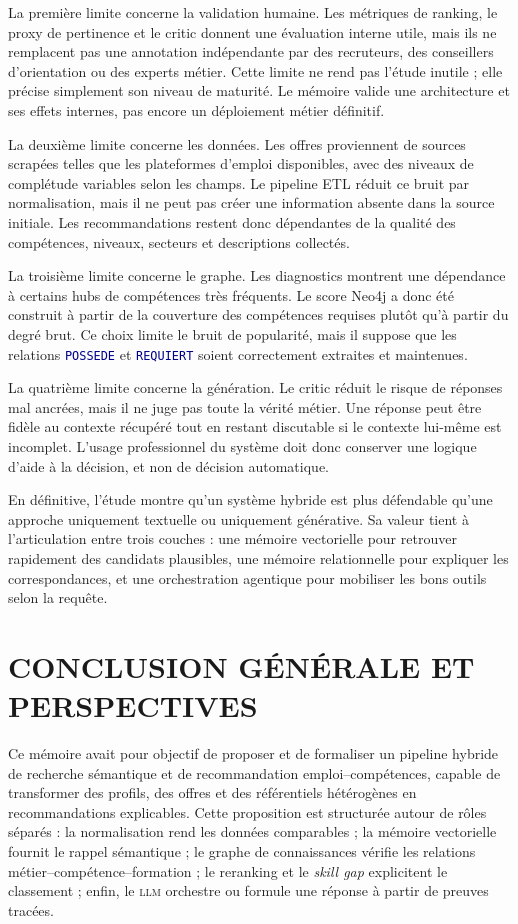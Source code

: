 \documentclass[12pt,twoside]{report}
\newcommand{\filevar}[1]{\texttt{\textcolor{darkblue}{#1}}}
\newcommand{\LLM}{\textsc{llm}}
\begin{document}
La première limite concerne la validation humaine. Les métriques de ranking, le proxy de pertinence et le critic donnent une évaluation interne utile, mais ils ne remplacent pas une annotation indépendante par des recruteurs, des conseillers d'orientation ou des experts métier. Cette limite ne rend pas l'étude inutile ; elle précise simplement son niveau de maturité. Le mémoire valide une architecture et ses effets internes, pas encore un déploiement métier définitif.

La deuxième limite concerne les données. Les offres proviennent de sources scrapées telles que les plateformes d'emploi disponibles, avec des niveaux de complétude variables selon les champs. Le pipeline ETL réduit ce bruit par normalisation, mais il ne peut pas créer une information absente dans la source initiale. Les recommandations restent donc dépendantes de la qualité des compétences, niveaux, secteurs et descriptions collectés.

La troisième limite concerne le graphe. Les diagnostics montrent une dépendance à certains hubs de compétences très fréquents. Le score Neo4j a donc été construit à partir de la couverture des compétences requises plutôt qu'à partir du degré brut. Ce choix limite le bruit de popularité, mais il suppose que les relations \filevar{POSSEDE} et \filevar{REQUIERT} soient correctement extraites et maintenues.

La quatrième limite concerne la génération. Le critic réduit le risque de réponses mal ancrées, mais il ne juge pas toute la vérité métier. Une réponse peut être fidèle au contexte récupéré tout en restant discutable si le contexte lui-même est incomplet. L'usage professionnel du système doit donc conserver une logique d'aide à la décision, et non de décision automatique.

En définitive, l'étude montre qu'un système hybride est plus défendable qu'une approche uniquement textuelle ou uniquement générative. Sa valeur tient à l'articulation entre trois couches : une mémoire vectorielle pour retrouver rapidement des candidats plausibles, une mémoire relationnelle pour expliquer les correspondances, et une orchestration agentique pour mobiliser les bons outils selon la requête.


\chapter*{CONCLUSION GÉNÉRALE ET PERSPECTIVES}
Ce mémoire avait pour objectif de proposer et de formaliser un pipeline hybride de recherche sémantique et de recommandation emploi--compétences, capable de transformer des profils, des offres et des référentiels hétérogènes en recommandations explicables. Cette proposition est structurée autour de rôles séparés : la normalisation rend les données comparables ; la mémoire vectorielle fournit le rappel sémantique ; le graphe de connaissances vérifie les relations métier--compétence--formation ; le reranking et le \textit{skill gap} explicitent le classement ; enfin, le \LLM{} orchestre ou formule une réponse à partir de preuves tracées.
\end{document}
